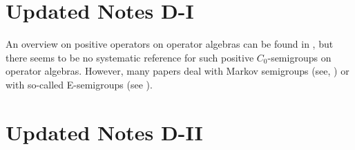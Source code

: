 \section*{Updated Notes D-I}
An overview on positive operators on operator algebras can be found in , but there seems to be no systematic reference for such positive 
$C_{0}$-semigroups on operator algebras.
However, many papers deal with Markov semigroups (see, \eg {}) or with so-called E-semigroups (see ).
\section*{Updated Notes D-II}
